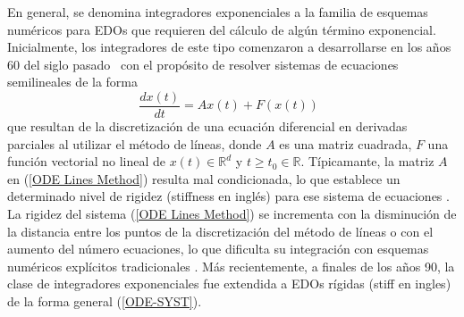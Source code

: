 En general, se denomina integradores exponenciales a la familia
de esquemas numéricos para EDOs que requieren del cálculo de algún término exponencial. Inicialmente, los integradores de este tipo comenzaron a desarrollarse en los años 60 del siglo pasado~\cite{Berland07} con el propósito de resolver sistemas de ecuaciones semilineales de la forma
\begin{equation}
\frac{dx(t)}{dt} = Ax(t) + F(x(t))  \;\;  \label{ODE Lines Method}
\end{equation}
que resultan de la discretización de una ecuación diferencial en derivadas parciales al utilizar el método de líneas, donde $A$ es una
matriz cuadrada, $F$ una función vectorial no lineal de $x(t)\in\mathbb{R}^d$ y $t\geq t_0 \in \mathbb{R}$. Típicamante, la matriz $A$ en (\ref{ODE Lines Method}) resulta mal condicionada, lo que establece un determinado nivel de rigidez (stiffness en inglés) para ese sistema de ecuaciones \cite{schiesser2012}. La rigidez del sistema (\ref{ODE Lines Method}) se incrementa con la disminución de la distancia entre los puntos de la discretización del método de líneas o con el aumento del número ecuaciones, lo que dificulta su integración con esquemas numéricos explícitos tradicionales \cite{schiesser2012}. Más recientemente, a finales de los años 90, la clase de integradores exponenciales fue extendida a EDOs rígidas (stiff en ingles) de la forma general (\ref{ODE-SYST}).

